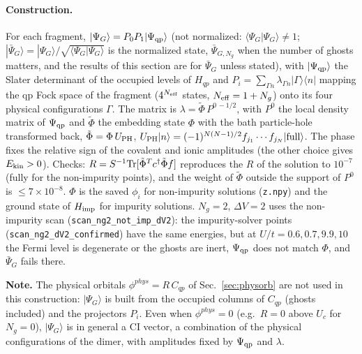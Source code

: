 \documentclass[11pt]{article}
\newcommand{\Ng}{N_{g}}
\newcommand{\dV}{\Delta V}
\begin{document}
\paragraph{Construction.} For each fragment, $|\Psi_G\rangle=P_0P_1|\Psi_{\rm qp}\rangle$ (not normalized: $\langle\Psi_G|\Psi_G\rangle\neq1$; $|\bar\Psi_G\rangle=|\Psi_G\rangle/\sqrt{\langle\Psi_G|\Psi_G\rangle}$ is the normalized state, $\bar\Psi_{G,\Ng}$ when the number of ghosts matters, and the results of this section are for $\bar\Psi_G$ unless stated), with $|\Psi_{\rm qp}\rangle$ the Slater determinant of the occupied levels of $H_{qp}$ and $P_i=\sum_{\Gamma n}\lambda_{\Gamma n}|\Gamma\rangle\langle n|$ mapping the qp Fock space of the fragment ($4^{N_{\rm eff}}$ states, $N_{\rm eff}=1+\Ng$) onto its four physical configurations $\Gamma$. The matrix is $\lambda=\tilde\Phi\,P^{0\,-1/2}$, with $P^0$ the local density matrix of $\Psi_{\rm qp}$ and $\tilde\Phi$ the embedding state $\Phi$ with the bath particle-hole transformed back, $\tilde\Phi=\Phi\,U_{\rm PH}$, $U_{\rm PH}|n\rangle=(-1)^{N(N-1)/2}f_{j_1}\cdots f_{j_N}|{\rm full}\rangle$.
The phase fixes the relative sign of the covalent and ionic amplitudes (the other choice gives $E_{\rm kin}>0$). Checks: $R=S^{-1}{\rm Tr}[\tilde\Phi^{T}c^\dagger\tilde\Phi f]$ reproduces the $R$ of the solution to $10^{-7}$ (fully for the non-impurity points), and the weight of $\tilde\Phi$ outside the support of $P^0$ is $\le7\times10^{-8}$.
$\Phi$ is the saved $\phi_i$ for non-impurity solutions (\texttt{z.npy}) and the ground state of $H_{\rm imp}$ for impurity solutions. $\Ng=2$, $\dV=2$ uses the non-impurity scan (\texttt{scan\_ng2\_not\_imp\_dV2}): the impurity-solver points (\texttt{scan\_ng2\_dV2\_confirmed}) have the same energies, but at $U/t=0.6,0.7,9.9,10$ the Fermi level is degenerate or the ghosts are inert, $\Psi_{\rm qp}$ does not match $\Phi$, and $\bar\Psi_G$ fails there.

\textbf{Note.} The physical orbitals $\phi^{phys}=R\,C_{qp}$ of Sec.~\ref{sec:physorb} are not used in this construction: $|\Psi_G\rangle$ is built from the occupied columns of $C_{qp}$ (ghosts included) and the projectors $P_i$. Even when $\phi^{phys}=0$ (e.g.\ $R=0$ above $U_c$ for $\Ng=0$), $|\Psi_G\rangle$ is in general a CI vector, a combination of the physical configurations of the dimer, with amplitudes fixed by $\Psi_{\rm qp}$ and $\lambda$.
\end{document}

